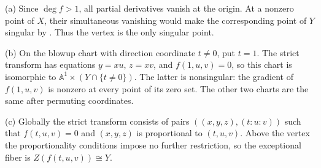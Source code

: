 (a) Since $\deg f>1$, all partial derivatives vanish at the origin. At a nonzero point of $X$, their simultaneous vanishing would make the corresponding point of $Y$ singular by . Thus the vertex is the only singular point.

(b) On the blowup chart with direction coordinate $t\ne0$, put $t=1$. The strict transform has equations $y=xu$, $z=xv$, and $f(1,u,v)=0$, so this chart is isomorphic to $\mathbb{A}^1\times(Y\cap\{t\ne0\})$. The latter is nonsingular: the gradient of $f(1,u,v)$ is nonzero at every point of its zero set. The other two charts are the same after permuting coordinates.

(c) Globally the strict transform consists of pairs $((x,y,z),(t:u:v))$ such that $f(t,u,v)=0$ and $(x,y,z)$ is proportional to $(t,u,v)$. Above the vertex the proportionality conditions impose no further restriction, so the exceptional fiber is $Z(f(t,u,v))\cong Y$.
